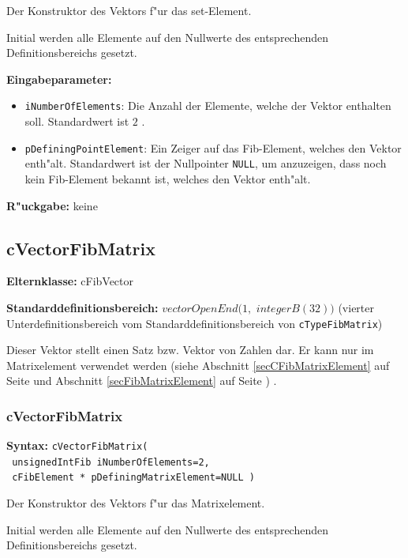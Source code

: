 \bigskip\noindent
Der Konstruktor des Vektors f"ur das set-Element.

Initial werden alle Elemente auf den Nullwerte des entsprechenden Definitionsbereichs gesetzt.

\bigskip\noindent
\textbf{Eingabeparameter:}
\begin{itemize}
 \item \verb|iNumberOfElements|: Die Anzahl der Elemente, welche der Vektor enthalten soll. Standardwert ist $2$ .
 \item \verb|pDefiningPointElement|: Ein Zeiger auf das Fib-Element, welches den Vektor enth"alt. Standardwert ist der Nullpointer \verb|NULL|, um anzuzeigen, dass noch kein Fib-Element bekannt ist, welches den Vektor enth"alt.
\end{itemize}

\bigskip\noindent
\textbf{R"uckgabe:} keine


\subsection{cVectorFibMatrix}

\bigskip\noindent
\textbf{Elternklasse:} cFibVector

\bigskip\noindent
\textbf{Standarddefinitionsbereich:} $vectorOpenEnd( 1,$ $integerB(32) )$ (vierter Unterdefinitionsbereich vom Standarddefinitionsbereich von \verb|cTypeFibMatrix|)

\bigskip\noindent
Dieser Vektor stellt einen Satz bzw. Vektor von Zahlen dar. Er kann nur im Matrixelement verwendet werden (siehe Abschnitt \ref{secCFibMatrixElement} auf Seite \pageref{secCFibMatrixElement} und Abschnitt \ref{secFibMatrixElement} auf Seite \pageref{secFibMatrixElement} ) .


\subsubsection{cVectorFibMatrix}

\textbf{Syntax:} \verb|cVectorFibMatrix(| \\\verb| unsignedIntFib iNumberOfElements=2,| \\\verb| cFibElement * pDefiningMatrixElement=NULL )|

\bigskip\noindent
Der Konstruktor des Vektors f"ur das Matrixelement.

Initial werden alle Elemente auf den Nullwerte des entsprechenden Definitionsbereichs gesetzt.

